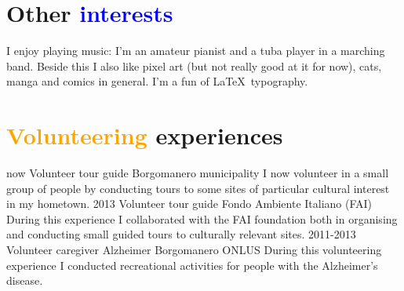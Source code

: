 \documentclass[a4paper]{friggeri-cv}
\begin{document}
\section{Other \textcolor{blue}{interests}}
I enjoy playing music: I'm an amateur pianist and a tuba player in a marching band. Beside this I also like pixel art (but not really good at it for now), cats, manga and comics in general. I'm a fun of \LaTeX\ typography.
\section{\textcolor{orange}{Volunteering} experiences}
\begin{entrylist}
	\entry
	{now}
	{Volunteer tour guide}
	{Borgomanero municipality}
	{I now volunteer in a small group of people by conducting tours to some sites of particular cultural interest in my hometown.}
	\entry
	{2013}
	{Volunteer tour guide}
	{Fondo Ambiente Italiano (FAI)}
	{During this experience I collaborated with the FAI foundation both in organising and conducting small guided tours to culturally relevant sites.}
	\entry
	{2011-2013}
	{Volunteer caregiver}
	{Alzheimer Borgomanero ONLUS}
	{During this volunteering experience I conducted recreational activities for people with the Alzheimer's disease.}
\end{entrylist}
\end{document}
